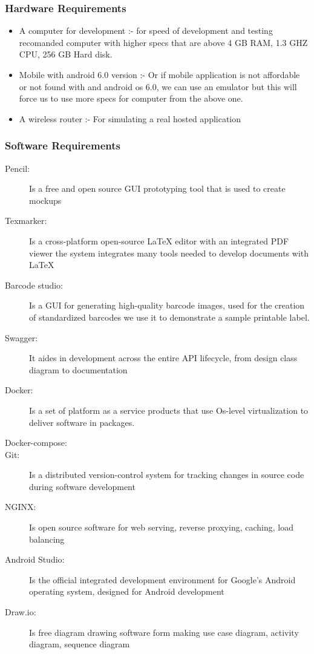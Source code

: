 \subsubsection{Hardware Requirements}
\begin{itemize}
	\item A computer for development :- for speed of development and testing recomanded computer with higher specs that are above 4 GB RAM, 1.3 GHZ CPU, 256 GB Hard disk.
	\item Mobile with android 6.0 version :- Or if mobile application is not affordable or not found with and android os 6.0, we can use an emulator but this will force us to use more specs for computer from the above one.
	\item A wireless router :- For simulating a real hosted application  
\end{itemize} 

\subsubsection{Software Requirements}
\begin{description}
	\item[Pencil:] Is a free and open source GUI prototyping tool that is used to create mockups
	\item[Texmarker:] Is a cross-platform open-source LaTeX editor with an integrated PDF viewer the system integrates many tools needed to develop documents with LaTeX
	\item[Barcode studio:] Is a GUI for generating high-quality barcode images, used for the creation of standardized barcodes we use it to demonstrate a sample printable label.
	\item[Swagger:] It aides in development across the entire API lifecycle, from design class diagram to documentation
	\item[Docker:] Is a set of platform as a service products that use Os-level virtualization to deliver software in packages.
	\item[Docker-compose:]
	\item[Git:] Is a distributed version-control system for tracking changes in source code during software development
	\item[NGINX:] Is open source software for web serving, reverse proxying, caching, load balancing
	\item[Android Studio:] Is the official integrated development environment for Google's Android operating  system, designed for Android development
	\item[Draw.io:] Is free diagram drawing software form making use case diagram, activity diagram, sequence diagram
\end{description}
	
